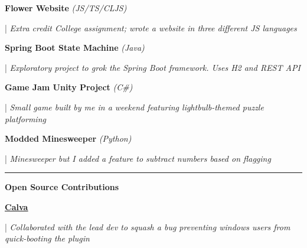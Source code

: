\documentclass[letterpaper,11pt]{article}
\begin{document}
\begin{minipage}[t]{0.28\textwidth}
    \raggedright
    \textbf{ Flower Website }\textit{(JS/TS/CLJS)} \\
\end{minipage}
\hfill
\begin{minipage}[t]{0.70\textwidth}
    \raggedright
    |\textit{ Extra credit College assignment; wrote a website in three different JS languages } \\
\end{minipage}

\begin{minipage}[t]{0.28\textwidth}
    \raggedright
    \textbf{ Spring Boot State Machine }\textit{(Java)} \\
\end{minipage}
\hfill
\begin{minipage}[t]{0.70\textwidth}
    \raggedright
    |\textit{ Exploratory project to grok the Spring Boot framework. Uses H2 and REST API} \\
\end{minipage}

\begin{minipage}[t]{0.28\textwidth}
    \raggedright
    \textbf{ Game Jam Unity Project }\textit{(C\#)} \\
\end{minipage}
\hfill
\begin{minipage}[t]{0.70\textwidth}
    \raggedright
    |\textit{ Small game built by me in a weekend featuring lightbulb-themed puzzle platforming} \\
\end{minipage}

\begin{minipage}[t]{0.28\textwidth}
    \raggedright
    \textbf{ Modded Minesweeper }\textit{(Python)} \\
\end{minipage}
\hfill
\begin{minipage}[t]{0.70\textwidth}
    \raggedright
    |\textit{ Minesweeper but I added a feature to subtract numbers based on flagging} \\
\end{minipage}

\noindent\rule{19.5cm}{0.4pt}

\textbf{\large \textcolor{magic_blue}{Open Source Contributions}}


\begin{minipage}[t]{0.08\textwidth}
    \raggedright
    \href{https://github.com/BetterThanTomorrow/calva/issues/2325}{ \underline{\textbf{Calva}}} \\
  \end{minipage}
  \hfill
  \begin{minipage}[t]{0.90\textwidth}
    \raggedright
    |\textit{ Collaborated with the lead dev to squash a bug preventing windows users from quick-booting the plugin } \\
  \end{minipage}
  
\end{document}
